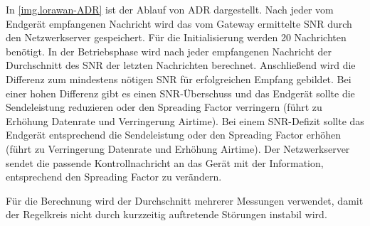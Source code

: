 In \autoref{img.lorawan-ADR} ist der Ablauf von ADR dargestellt.
Nach jeder vom Endgerät empfangenen Nachricht wird das vom Gateway ermittelte \acrlong{SNR} durch den Netzwerkserver gespeichert.
Für die Initialisierung werden 20 Nachrichten benötigt.
In der Betriebsphase wird nach jeder empfangenen Nachricht der Durchschnitt des SNR der letzten Nachrichten berechnet.
Anschließend wird die Differenz zum mindestens nötigen SNR für erfolgreichen Empfang gebildet.
Bei einer hohen Differenz gibt es einen SNR-Überschuss und das Endgerät sollte die Sendeleistung reduzieren oder den Spreading Factor verringern (führt zu Erhöhung Datenrate und Verringerung Airtime).
Bei einem SNR-Defizit sollte das Endgerät entsprechend die Sendeleistung oder den Spreading Factor erhöhen (führt zu Verringerung Datenrate und Erhöhung Airtime).
Der Netzwerkserver sendet die passende Kontrollnachricht an das Gerät mit der Information, entsprechend den Spreading Factor zu verändern.

Für die Berechnung wird der Durchschnitt mehrerer Messungen verwendet, damit der Regelkreis nicht durch kurzzeitig auftretende Störungen instabil wird.
